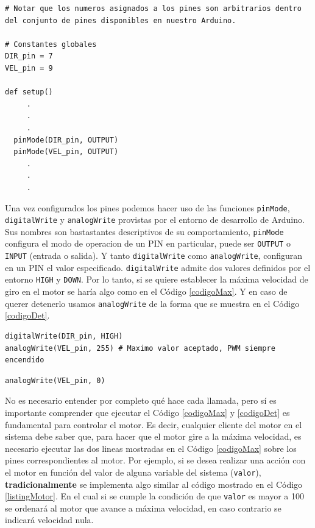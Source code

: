 \begin{lstlisting}[caption=Configuración inicial del control del motor DC.,label={listing1}]
# Notar que los numeros asignados a los pines son arbitrarios dentro del conjunto de pines disponibles en nuestro Arduino.

# Constantes globales
DIR_pin = 7
VEL_pin = 9

def setup()
     .
     .
     .
  pinMode(DIR_pin, OUTPUT)
  pinMode(VEL_pin, OUTPUT)
     .
     .
     .
\end{lstlisting}


Una vez configurados los pines podemos hacer uso de las funciones \verb|pinMode|, \verb|digitalWrite| y \verb|analogWrite| provistas por el entorno de desarrollo de Arduino. Sus nombres son bastastantes descriptivos de su comportamiento, \verb|pinMode| configura el modo de operacion de un PIN en particular, puede ser \verb|OUTPUT| o \verb|INPUT| (entrada o salida). Y tanto \verb|digitalWrite| como \verb|analogWrite|, configuran en un PIN el valor especificado. \verb|digitalWrite| admite dos valores definidos por el entorno \verb|HIGH| y \verb|DOWN|. Por lo tanto, si se quiere establecer la máxima velocidad de giro en el motor se haría algo como en el Código \ref{codigoMax}. Y en caso de querer detenerlo usamos \verb|analogWrite| de la forma que se muestra en el Código \ref{codigoDet}.

\begin{lstlisting}[caption=Establecer 
máxima velocidad giro en sentido horario.,label={codigoMax}]
digitalWrite(DIR_pin, HIGH)
analogWrite(VEL_pin, 255) # Maximo valor aceptado, PWM siempre encendido
\end{lstlisting}

\begin{lstlisting}[caption=Detener giro del motor DC., label={codigoDet}]
analogWrite(VEL_pin, 0)
\end{lstlisting}

No es necesario entender por completo qué hace cada llamada, pero sí es importante comprender que ejecutar el Código \ref{codigoMax} y \ref{codigoDet} es fundamental para controlar el motor. Es decir, cualquier cliente del motor en el sistema debe saber que, para hacer que el motor gire a la máxima velocidad, es necesario ejecutar las dos lineas mostradas en el Código \ref{codigoMax} sobre los pines correspondientes al motor. Por ejemplo, si se desea realizar una acción con el motor en función del valor de alguna variable del sistema (\verb|valor|), \textbf{tradicionalmente} se implementa algo similar al código mostrado en el Código \ref{listingMotor}. En el cual si se cumple la condición de que \verb|valor| es mayor a 100 se ordenará al motor que avance a máxima velocidad, en caso contrario se indicará velocidad nula.

